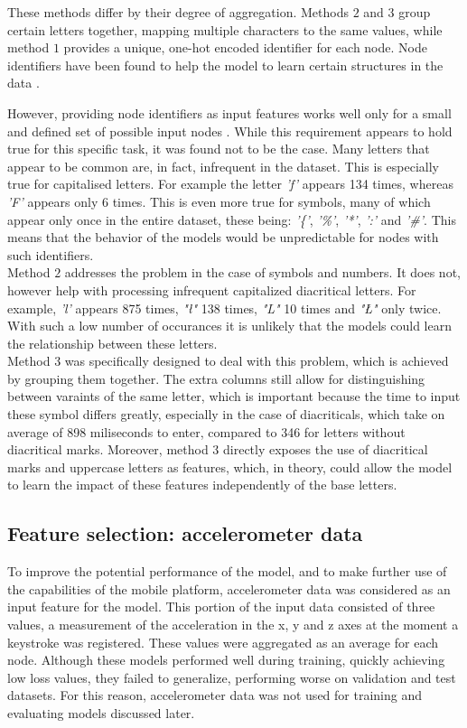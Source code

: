 These methods differ by their degree of aggregation. Methods $2$ and $3$ group certain letters together, mapping multiple characters to the same values, while method $1$ provides a unique, one-hot encoded identifier for each node. Node identifiers have been found to help the model to learn certain structures in the data \cite{you2021identityawaregraphneuralnetworks}. 

However, providing node identifiers as input features works well only for a small and defined set of possible input nodes \cite{Lesk2024}. While this requirement appears to hold true for this specific task, it was found not to be the case.
Many letters that appear to be common are, in fact, infrequent in the dataset. This is especially true for capitalised letters. For example the letter \textit{'f'} appears 134 times, whereas \textit{'F'} appears only 6 times. This is even more true for symbols, many of which appear only once in the entire dataset, these being: \textit{'\{'}, \textit{'\%'}, \textit{'*'}, \textit{':'} and \textit{'\#'}.
This means that the behavior of the models would be unpredictable for nodes with such identifiers.\\
Method $2$ addresses the problem in the case of symbols and numbers. It does not, however help with processing infrequent capitalized diacritical letters. For example, \textit{'l'} appears 875 times, \textit{"ł"} 138 times, \textit{"L"} 10 times and \textit{"Ł"} only twice. With such a low number of occurances it is unlikely that the models could learn the relationship between these letters. \\
Method $3$ was specifically designed to deal with this problem, which is achieved by grouping them together. The extra columns still allow for distinguishing between varaints of the same letter, which is important because the time to input these symbol differs greatly, especially in the case of diacriticals, which take on average of 898 miliseconds to enter, compared to 346 for letters without diacritical marks.
Moreover, method $3$ directly exposes the use of diacritical marks and uppercase letters as features, which, in theory, could allow the model to learn the impact of these features independently of the base letters. 

\subsection{Feature selection: accelerometer data} \label{accel_subsection}
To improve the potential performance of the model, and to make further use of the capabilities of the mobile platform, accelerometer data was considered as an input feature for the model. %
This portion of the input data consisted of three values, a measurement of the acceleration in the x, y and z axes at the moment a keystroke was registered. 
These values were aggregated as an average for each node. Although these models performed well during training, quickly achieving low loss values, they failed to generalize, performing worse on validation and test datasets. For this reason, accelerometer data was not used for training and evaluating models discussed later.

